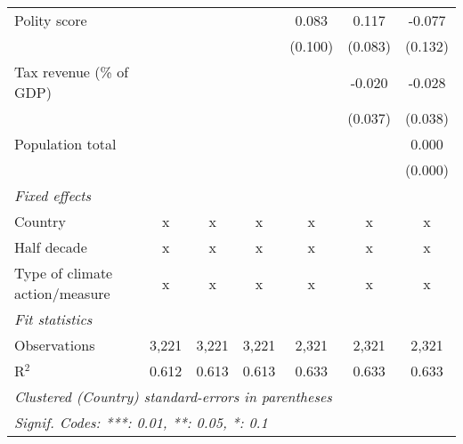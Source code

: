 \begin{tabular}{lcccccc}
   Polity score                                                       &               &                &                & 0.083          & 0.117          & -0.077\\   
                                                                      &               &                &                & (0.100)        & (0.083)        & (0.132)\\   
   Tax revenue (\% of GDP)                                            &               &                &                &                & -0.020         & -0.028\\   
                                                                      &               &                &                &                & (0.037)        & (0.038)\\   
   Population total                                                   &               &                &                &                &                & 0.000\\   
                                                                      &               &                &                &                &                & (0.000)\\   
   \emph{Fixed effects}\\
   Country                                                            & x             & x              & x              & x              & x              & x\\  
   Half decade                                                        & x             & x              & x              & x              & x              & x\\  
   Type of climate action/measure                                     & x             & x              & x              & x              & x              & x\\  
   \midrule \emph{Fit statistics}\\
   Observations                                                       & 3,221         & 3,221          & 3,221          & 2,321          & 2,321          & 2,321\\  
   R$^2$                                                              & 0.612         & 0.613          & 0.613          & 0.633          & 0.633          & 0.633\\  
   \midrule
   \multicolumn{7}{l}{\emph{Clustered (Country) standard-errors in parentheses}}\\
   \multicolumn{7}{l}{\emph{Signif. Codes: ***: 0.01, **: 0.05, *: 0.1}}\\
\end{tabular}
\par\endgroup


